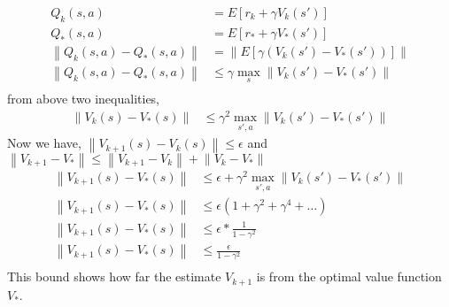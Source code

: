 \documentclass[12pt]{article}
\newcommand*{\norm}[1]{\left\lVert #1 \right\rVert}
\begin{document}
\begin{enumerate}
    \begin{align*}
        Q_k(s, a) &= E[r_k + \gamma V_k(s')] \\
        Q_*(s, a) &= E[r_* + \gamma V_*(s')] \\
        \norm{Q_k(s, a) - Q_*(s, a)} &= \norm{E[\gamma (V_k(s')-V_*(s'))]} \\
        \norm{Q_k(s, a) - Q_*(s, a)} &\leq \gamma \max_s \norm{V_k(s')-V_*(s')} \\
    \end{align*}
    from above two inequalities,
    \begin{align*}
        \norm{V_{k}(s)-V_{*}(s)} &\leq \gamma^2 \max_{s',a} \norm{V_k(s')-V_*(s')} 
    \end{align*}
    Now we have, $ \norm{V_{k+1}(s)-V_{k}(s)} \leq \epsilon $ and $ \norm{V_{k+1}-V_{*}} \leq \norm{V_{k+1}-V_k} + \norm{V_k-V_{*}} $
    \begin{align*}
        \norm{V_{k+1}(s)-V_{*}(s)} &\leq \epsilon + \gamma^2 \max_{s',a} \norm{V_k(s')-V_*(s')} \\
        \norm{V_{k+1}(s)-V_{*}(s)} &\leq \epsilon (1 + \gamma^2 + \gamma^4 + \dots) \\
        \norm{V_{k+1}(s)-V_{*}(s)} &\leq \epsilon * \frac{1}{1-\gamma^2} \\
        \norm{V_{k+1}(s)-V_{*}(s)} &\leq \frac{\epsilon}{1-\gamma^2} \\
    \end{align*}
    This bound shows how far the estimate $V_{k+1}$ is from the optimal value function $V_*$.
\end{enumerate}
\end{document}
